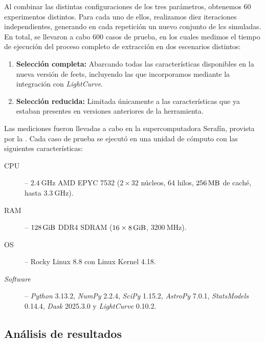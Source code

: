 Al combinar las distintas configuraciones de los tres parámetros, obtenemos 60 experimentos distintos. Para cada uno de ellos, realizamos diez iteraciones independientes, generando en cada repetición un nuevo conjunto de \glspl{lc} simuladas. En total, se llevaron a cabo 600 casos de prueba, en los cuales medimos el tiempo de ejecución del proceso completo de extracción en dos escenarios distintos:

\begin{enumerate} 
    \item \textbf{Selección completa:} Abarcando todas las características disponibles en la nueva versión de \gls{feets}, incluyendo las que incorporamos mediante la integración con \textit{LightCurve}. 
    
    \item \textbf{Selección reducida:} Limitada únicamente a las características que ya estaban presentes en versiones anteriores de la herramienta.
\end{enumerate}

Las mediciones fueron llevadas a cabo en la supercomputadora Serafín, provista por la \unc{}. Cada caso de prueba se ejecutó en una unidad de cómputo con las siguientes características:

\begin{description}
    \item[CPU] -- $\SI{2.4}{\giga\hertz}$ AMD EPYC\texttrademark{} 7532 ($2\times32$ núcleos, 64 hilos, $\SI{256}{\mega\byte}$ de caché, hasta $\SI{3.3}{\giga\hertz}$).
    \item[RAM] -- $\SI{128}{\gibi\byte}$ DDR4 SDRAM ($16 \times \SI{8}{\gibi\byte}$, $\SI{3200}{\mega\hertz}$).
    \item[OS] -- Rocky Linux 8.8 con Linux Kernel 4.18.
    \item[\emph{Software}] -- \textit{Python} 3.13.2, \textit{NumPy} 2.2.4, \textit{SciPy} 1.15.2, \textit{AstroPy} 7.0.1, \textit{StatsModels} 0.14.4, \textit{Dask} 2025.3.0 y \textit{Light\-Curve} 0.10.2.
\end{description}

\subsection{Análisis de resultados}

